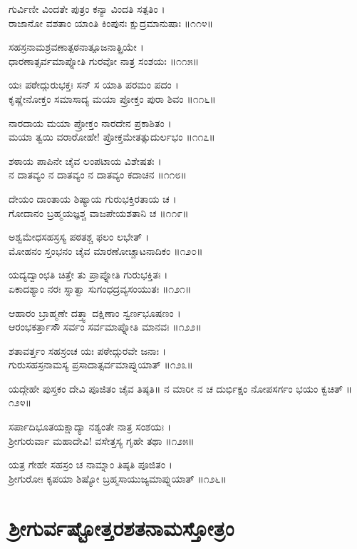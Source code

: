 ಗುರ್ವಿಣೀ ವಿಂದತೇ ಪುತ್ರಂ ಕನ್ಯಾ ವಿಂದತಿ ಸತ್ಪತಿಂ ।\\
ರಾಜಾನೋ ವಶತಾಂ ಯಾಂತಿ ಕಿಂಪುನಃ ಕ್ಷುದ್ರಮಾನುಷಾಃ ॥೧೧೪॥

ಸಹಸ್ರನಾಮಶ್ರವಣಾತ್ಪಠನಾತ್ಪೂಜನಾತ್ಪ್ರಿಯೇ ।\\
ಧಾರಣಾತ್ಸರ್ವಮಾಪ್ನೋತಿ ಗುರವೋ ನಾತ್ರ ಸಂಶಯಃ ॥೧೧೫॥

ಯಃ ಪಠೇದ್ಗುರುಭಕ್ತಃ ಸನ್ ಸ ಯಾತಿ ಪರಮಂ ಪದಂ ।\\
ಕೃಷ್ಣೇನೋಕ್ತಂ ಸಮಾಸಾದ್ಯ ಮಯಾ ಪ್ರೋಕ್ತಂ ಪುರಾ ಶಿವಂ ॥೧೧೬॥

ನಾರದಾಯ ಮಯಾ ಪ್ರೋಕ್ತಂ ನಾರದೇನ ಪ್ರಕಾಶಿತಂ ।\\
ಮಯಾ ತ್ವಯಿ ವರಾರೋಹೇ! ಪ್ರೋಕ್ತಮೇತತ್ಸುದುರ್ಲಭಂ ॥೧೧೭॥

ಶಠಾಯ ಪಾಪಿನೇ ಚೈವ ಲಂಪಟಾಯ ವಿಶೇಷತಃ ।\\
ನ ದಾತವ್ಯಂ ನ ದಾತವ್ಯಂ ನ ದಾತವ್ಯಂ ಕದಾಚನ ॥೧೧೮॥

ದೇಯಂ ದಾಂತಾಯ ಶಿಷ್ಯಾಯ ಗುರುಭಕ್ತಿರತಾಯ ಚ ।\\
ಗೋದಾನಂ ಬ್ರಹ್ಮಯಜ್ಞಶ್ಚ ವಾಜಪೇಯಶತಾನಿ ಚ ॥೧೧೯॥

ಅಶ್ವಮೇಧಸಹಸ್ರಸ್ಯ ಪಠತಶ್ಚ ಫಲಂ ಲಭೇತ್ ।\\
ಮೋಹನಂ ಸ್ತಂಭನಂ ಚೈವ ಮಾರಣೋಚ್ಚಾಟನಾದಿಕಂ ॥೧೨೦॥

ಯದ್ಯದ್ವಾಂಛತಿ ಚಿತ್ತೇ ತು ಪ್ರಾಪ್ನೋತಿ ಗುರುಭಕ್ತಿತಃ ।\\
ಏಕಾದಶ್ಯಾಂ ನರಃ ಸ್ನಾತ್ವಾ ಸುಗಂಧದ್ರವ್ಯಸಂಯುತಃ ॥೧೨೧॥

ಆಹಾರಂ ಬ್ರಾಹ್ಮಣೇ ದತ್ತ್ವಾ ದಕ್ಷಿಣಾಂ ಸ್ವರ್ಣಭೂಷಣಂ ।\\
ಆರಂಭಕರ್ತ್ತಾಸೌ ಸರ್ವಂ ಸರ್ವಮಾಪ್ನೋತಿ ಮಾನವಃ ॥೧೨೨॥

ಶತಾವರ್ತ್ತಂ ಸಹಸ್ರಂಚ ಯಃ ಪಠೇದ್ಗುರವೇ ಜನಾಃ ।\\
ಗುರುಸಹಸ್ರನಾಮಸ್ಯ ಪ್ರಸಾದಾತ್ಸರ್ವಮಾಪ್ನುಯಾತ್ ॥೧೨೩॥

ಯದ್ಗೇಹೇ ಪುಸ್ತಕಂ ದೇವಿ ಪೂಜಿತಂ ಚೈವ ತಿಷ್ಠತಿ॥
ನ ಮಾರೀ ನ ಚ ದುರ್ಭಿಕ್ಷಂ ನೋಪಸರ್ಗಂ ಭಯಂ ಕ್ವಚಿತ್ ॥೧೨೪॥

ಸರ್ಪಾದಿಭೂತಯಕ್ಷಾದ್ಯಾ ನಶ್ಯಂತೇ ನಾತ್ರ ಸಂಶಯಃ ।\\
ಶ್ರೀಗುರುರ್ವಾ ಮಹಾದೇವಿ! ವಸೇತ್ತಸ್ಯ ಗೃಹೇ ತಥಾ ॥೧೨೫॥

ಯತ್ರ ಗೇಹೇ ಸಹಸ್ರಂ ಚ ನಾಮ್ನಾಂ ತಿಷ್ಠತಿ ಪೂಜಿತಂ ।\\
ಶ್ರೀಗುರೋಃ ಕೃಪಯಾ ಶಿಷ್ಯೋ ಬ್ರಹ್ಮಸಾಯುಜ್ಯಮಾಪ್ನುಯಾತ್ ॥೧೨೬॥



\section{ಶ್ರೀಗುರ್ವಷ್ಟೋತ್ತರಶತನಾಮಸ್ತೋತ್ರಂ}

